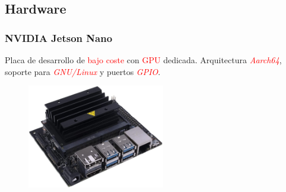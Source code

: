 \documentclass{beamer}
\begin{document}
\subsection{Hardware}
\begin{frame}
	\frametitle{NVIDIA Jetson Nano}
	\begin{outline}
		\1 Placa de desarrollo de \textcolor{red}{bajo coste} con \textcolor{red}{GPU} dedicada.
		\1 Arquitectura \textcolor{red}{\textit{Aarch64}}, soporte para \textcolor{red}{\textit{GNU/Linux}} y puertos \textcolor{red}{\textit{GPIO}}.
	\end{outline}
	\begin{figure}
		\centering
		\includegraphics[width=6cm]{figs/jetsonnano}
	\end{figure}
\end{frame}
\end{document}
